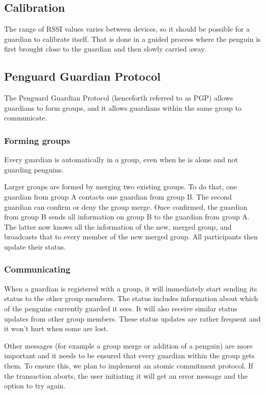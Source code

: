 \documentclass{report}
\begin{document}
\subsection{Calibration}

The range of RSSI values varies between devices, so it should be possible for a guardian to calibrate itself. That is done in a guided process where the penguin is first brought close to the guardian and then slowly carried away.

\subsection{Penguard Guardian Protocol}

The Penguard Guardian Protocol (henceforth referred to as PGP) allows guardians to form groups, and it allows guardians within the same group to communicate.

\subsubsection{Forming groups}

Every guardian is automatically in a group, even when he is alone and not guarding penguins.

Larger groups are formed by merging two existing groups. To do that, one guardian from group A contacts one guardian from group B. The second guardian can confirm or deny the group merge. Once confirmed, the guardian from group B sends all information on group B to the guardian from group A. The latter now knows all the information of the new, merged group, and broadcasts that to every member of the new merged group. All participants then update their status.

\subsubsection{Communicating}

When a guardian is registered with a group, it will immediately start sending its status to the other group members. The status includes information about which of the penguins currently guarded it sees. It will also receive similar status updates from other group members. These status updates are rather frequent and it won't hurt when some are lost.

Other messages (for example a group merge or addition of a penguin) are more important and it needs to be ensured that every guardian within the group gets them. To ensure this, we plan to implement an atomic commitment protocol. If the transaction aborts, the user initiating it will get an error message and the option to try again.
\end{document}
